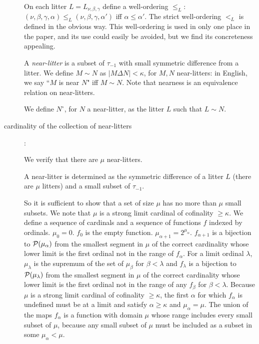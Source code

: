 \documentclass[112pt]{article}
\begin{document}
\begin{description}
On each litter $L =  L_{\nu,\beta,\gamma}$ define a well-ordering $\leq_L$:  $(\nu,\beta,\gamma,\alpha) \leq_L (\nu,\beta,\gamma,\alpha')$  iff $\alpha\leq \alpha'$.
The strict well-ordering $<_L$ is defined in the obvious way.  This well-ordering is used in only one place in the paper, and its use could easily be avoided, but we find its concreteness appealing.

A {\em near-litter\/} is a subset of $\tau_{-1}$ with small symmetric difference from a litter.  We define $M \sim N$ as $|M \Delta N|<\kappa$, for $M,N$ near-litters:  in English, we say ``$M$ is near $N$" iff $M \sim N$.  Note that nearness is an equivalence relation on near-litters.  

We define $N^\circ$, for $N$ a near-litter, as the litter $L$ such that $L \sim N$.  


\item[cardinality of the collection of near-litters]:

 We verify that there are $\mu$ near-litters.

A near-litter is determined as the symmetric difference of a litter $L$ (there are $\mu$ litters) and a small subset of
$\tau_{-1}$.

So it is sufficient to show that a set of size $\mu$ has no more than $\mu$ small subsets.  We note that $\mu$ is
a strong limit cardinal of cofinality $\geq\kappa$.  We define a sequence of cardinals and a sequence of functions $f$ indexed by ordinals.
$\mu_0 = 0$.  $f_0$ is the empty function.  $\mu_{\alpha+1}=2^{\mu_\alpha}$.  $f_{\alpha+1}$ is a bijection
to ${\cal P}({\mu_\alpha})$ from the smallest segment in $\mu$ of the correct cardinality whose lower limit is the first ordinal not in the range of $f_{\alpha}$.  For a limit ordinal $\lambda$, $\mu_{\lambda}$ is the supremum of the set of
$\mu_\beta$ for $\beta<\lambda$ and $f_{\lambda}$ is a bijection to ${\cal P}({\mu_\lambda})$ from the smallest
segment in $\mu$ of the correct cardinality whose lower limit is the first ordinal not in the range of any
$f_\beta$ for $\beta<\lambda$.   Because $\mu$ is a strong limit cardinal of cofinality $\geq \kappa$, the first $\alpha$ for which $f_\alpha$ is undefined must be at a limit and satisfy $\alpha \geq \kappa$ and $\mu_\alpha = \mu$.   The union of the maps $f_\alpha$ is a function with domain $\mu$ whose range includes every small subset of $\mu$, because any small subset of $\mu$ must be included as a subset in some $\mu_\alpha<\mu$.


\end{description}
\end{document}
